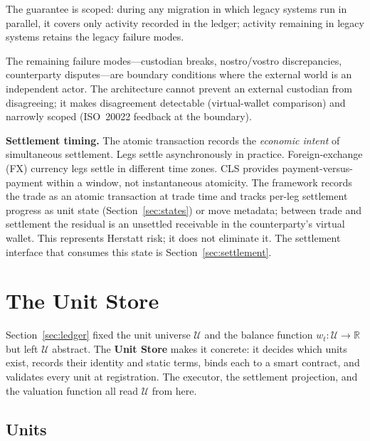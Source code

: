 \documentclass[11pt,a4paper]{article}
\begin{document}
The guarantee is scoped: during any migration in which legacy systems run in parallel, it covers only activity recorded in the ledger; activity remaining in legacy systems retains the legacy failure modes.

The remaining failure modes---custodian breaks, nostro/vostro discrepancies, counterparty disputes---are boundary conditions where the external world is an independent actor. The architecture cannot prevent an external custodian from disagreeing; it makes disagreement detectable (virtual-wallet comparison) and narrowly scoped (ISO~20022 feedback at the boundary).

\noindent\textbf{Settlement timing.} The atomic transaction records the \emph{economic intent} of simultaneous settlement. Legs settle asynchronously in practice. Foreign-exchange (FX) currency legs settle in different time zones. CLS provides payment-versus-payment within a window, not instantaneous atomicity. The framework records the trade as an atomic transaction at trade time and tracks per-leg settlement progress as unit state (Section~\ref{sec:states}) or move metadata; between trade and settlement the residual is an unsettled receivable in the counterparty's virtual wallet. This represents Herstatt risk; it does not eliminate it. The settlement interface that consumes this state is Section~\ref{sec:settlement}.

\clearpage

\section{The Unit Store}
\label{sec:unit-store}
\newtheorem*{condition}{Condition}

Section~\ref{sec:ledger} fixed the unit universe $\mathcal{U}$ and the balance function $w_t : \mathcal{U} \to \mathbb{R}$ but left $\mathcal{U}$ abstract. The \textbf{Unit Store} makes it concrete: it decides which units exist, records their identity and static terms, binds each to a smart contract, and validates every unit at registration. The executor, the settlement projection, and the valuation function all read $\mathcal{U}$ from here.

\subsection{Units}
\end{document}

